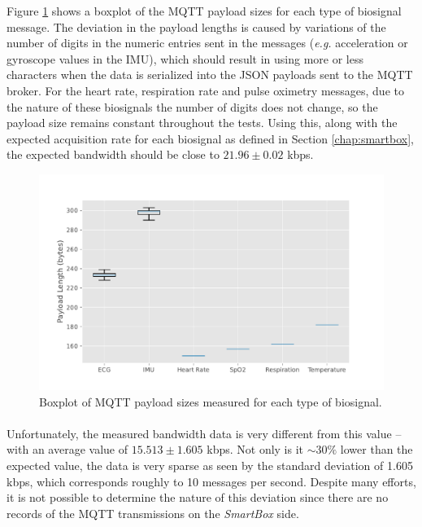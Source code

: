 Figure \ref{fig:labtest-mqtt-payload-sizes} shows a boxplot of the \acs{MQTT} payload sizes for each type of biosignal message. The deviation in the payload lengths is caused by variations of the number of digits in the numeric entries sent in the messages (\textit{e.g.} acceleration or gyroscope values in the \acs{IMU}), which should result in using more or less characters when the data is serialized into the \acs{JSON} payloads sent to the \acs{MQTT} broker. For the heart rate, respiration rate and pulse oximetry messages, due to the nature of these biosignals the number of digits does not change, so the payload size remains constant throughout the tests. Using this, along with the expected acquisition rate for each biosignal as defined in Section \ref{chap:smartbox}, the expected bandwidth should be close to $21.96 \pm 0.02$ kbps.

\begin{figure}[H]
    \centering
    \includegraphics[width=0.85\linewidth]{images/labtest_mqtt_payload_sizes.pdf}
    \caption{Boxplot of \acs{MQTT} payload sizes measured for each type of biosignal.}
    \label{fig:labtest-mqtt-payload-sizes}
\end{figure}


\paragraph{} Unfortunately, the measured bandwidth data is very different from this value -- with an average value of $15.513 \pm 1.605$ kbps. Not only is it $\sim 30\%$ lower than the expected value, the data is very sparse as seen by the standard deviation of 1.605 kbps, which corresponds roughly to 10 messages per second. Despite many efforts, it is not possible to determine the nature of this deviation since there are no records of the \acs{MQTT} transmissions on the \textit{SmartBox} side. 

